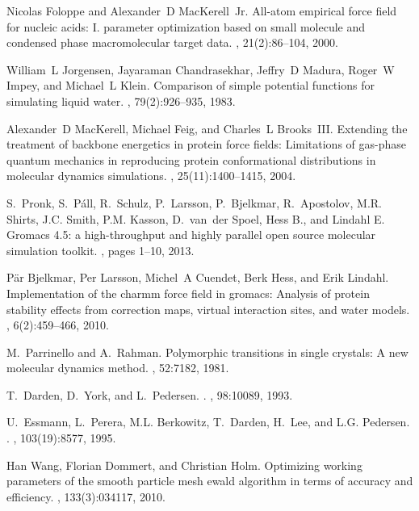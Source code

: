 \documentclass[journal=jctcce,manuscript=article]{achemso}
\begin{document}
\begin{thebibliography}{10}
Nicolas Foloppe and Alexander~D MacKerell~Jr.
\newblock All-atom empirical force field for nucleic acids: I. parameter
  optimization based on small molecule and condensed phase macromolecular
  target data.
, 21(2):86--104, 2000.

William~L Jorgensen, Jayaraman Chandrasekhar, Jeffry~D Madura, Roger~W Impey,
  and Michael~L Klein.
\newblock Comparison of simple potential functions for simulating liquid water.
, 79(2):926--935, 1983.

Alexander~D MacKerell, Michael Feig, and Charles~L Brooks~III.
\newblock Extending the treatment of backbone energetics in protein force
  fields: Limitations of gas-phase quantum mechanics in reproducing protein
  conformational distributions in molecular dynamics simulations.
, 25(11):1400--1415, 2004.

S.~Pronk, S.~P{\'a}ll, R.~Schulz, P.~Larsson, P.~Bjelkmar, R.~Apostolov, M.R.
  Shirts, J.C. Smith, P.M. Kasson, D.~van~der Spoel, Hess B., and Lindahl E.
\newblock Gromacs 4.5: a high-throughput and highly parallel open source
  molecular simulation toolkit.
, pages 1--10, 2013.

P\"{a}r Bjelkmar, Per Larsson, Michel~A Cuendet, Berk Hess, and Erik Lindahl.
\newblock Implementation of the charmm force field in gromacs: Analysis of
  protein stability effects from correction maps, virtual interaction sites,
  and water models.
, 6(2):459--466, 2010.

M.~Parrinello and A.~Rahman.
\newblock Polymorphic transitions in single crystals: A new molecular dynamics
  method.
, 52:7182, 1981.

T.~Darden, D.~York, and L.~Pedersen.
.
, 98:10089, 1993.

U.~Essmann, L.~Perera, M.L. Berkowitz, T.~Darden, H.~Lee, and L.G. Pedersen.
.
, 103(19):8577, 1995.

Han Wang, Florian Dommert, and Christian Holm.
\newblock Optimizing working parameters of the smooth particle mesh ewald
  algorithm in terms of accuracy and efficiency.
, 133(3):034117, 2010.


\end{thebibliography}
\end{document}
